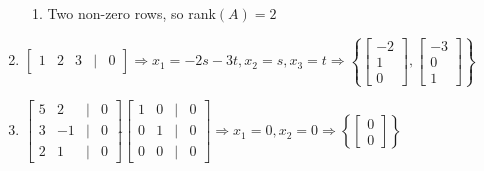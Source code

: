 \documentclass[12pt]{article}
\begin{document}
\begin{enumerate}
\begin{enumerate}
          \item Two non-zero rows, so rank$(A)=2$

        \end{enumerate}

    \setcounter{enumi}{28}

  \item $\begin{bmatrix} 1 & 2 & 3 & | & 0 \end{bmatrix}\Rightarrow x_1=-2s-3t, x_2=s, x_3=t\Rightarrow \left\{ \begin{bmatrix} -2\\1\\0\end{bmatrix},\begin{bmatrix} -3\\ 0\\ 1\end{bmatrix} \right\}$

    \setcounter{enumi}{34}

  \item $\begin{bmatrix} 5 & 2 & | & 0\\ 3 & -1 & | & 0\\ 2 & 1 & | & 0 \end{bmatrix}\widetilde{ }\begin{bmatrix} 1 & 0 & | & 0\\ 0 & 1 & | & 0\\ 0 & 0 & | & 0 \end{bmatrix}\Rightarrow x_1=0,x_2=0\Rightarrow \left\{ \begin{bmatrix} 0\\0\end{bmatrix} \right\}$

    \setcounter{enumi}{38}


\end{enumerate}
\end{document}
